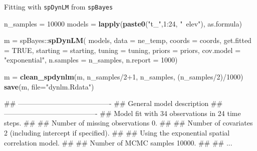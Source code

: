 \documentclass[11pt,ignorenonframetext,]{beamer}
\newenvironment{Shaded}{}{}
\newcommand{\DataTypeTok}[1]{\textcolor[rgb]{0.56,0.13,0.00}{#1}}
\newcommand{\DecValTok}[1]{\textcolor[rgb]{0.25,0.63,0.44}{#1}}
\newcommand{\KeywordTok}[1]{\textcolor[rgb]{0.00,0.44,0.13}{\textbf{#1}}}
\newcommand{\NormalTok}[1]{#1}
\newcommand{\OperatorTok}[1]{\textcolor[rgb]{0.40,0.40,0.40}{#1}}
\newcommand{\OtherTok}[1]{\textcolor[rgb]{0.00,0.44,0.13}{#1}}
\newcommand{\StringTok}[1]{\textcolor[rgb]{0.25,0.44,0.63}{#1}}
\let\oldShaded\Shaded
\let\endoldShaded\endShaded
\renewenvironment{Shaded}{\footnotesize\begin{spacing}{0.9}\oldShaded}{\endoldShaded\end{spacing}}
\let\oldverbatim\verbatim
\let\endoldverbatim\endverbatim
\newcommand{\scriptoutput}{
  \renewenvironment{Shaded}{\scriptsize\begin{spacing}{0.9}\oldShaded}{\endoldShaded\end{spacing}}
  \renewenvironment{verbatim}{\scriptsize\begin{spacing}{0.9}\oldverbatim}{\endoldverbatim\end{spacing}}
}
\begin{document}
\begin{frame}[fragile]{Fitting with \texttt{spDynLM} from
\texttt{spBayes}}
\protect\hypertarget{fitting-with-spdynlm-from-spbayes}{}

\scriptoutput

\begin{Shaded}
\begin{Highlighting}[]
\NormalTok{n_samples =}\StringTok{ }\DecValTok{10000}
\NormalTok{models =}\StringTok{ }\KeywordTok{lapply}\NormalTok{(}\KeywordTok{paste0}\NormalTok{(}\StringTok{"t_"}\NormalTok{,}\DecValTok{1}\OperatorTok{:}\DecValTok{24}\NormalTok{, }\StringTok{"~elev"}\NormalTok{), as.formula)}

\NormalTok{m =}\StringTok{ }\NormalTok{spBayes}\OperatorTok{::}\KeywordTok{spDynLM}\NormalTok{(}
\NormalTok{  models, }\DataTypeTok{data =}\NormalTok{ ne_temp, }\DataTypeTok{coords =}\NormalTok{ coords, }\DataTypeTok{get.fitted =} \OtherTok{TRUE}\NormalTok{,}
  \DataTypeTok{starting =}\NormalTok{ starting, }\DataTypeTok{tuning =}\NormalTok{ tuning, }\DataTypeTok{priors =}\NormalTok{ priors,}
  \DataTypeTok{cov.model =} \StringTok{"exponential"}\NormalTok{, }\DataTypeTok{n.samples =}\NormalTok{ n_samples, }\DataTypeTok{n.report =} \DecValTok{1000}\NormalTok{)}

\NormalTok{m =}\StringTok{ }\KeywordTok{clean_spdynlm}\NormalTok{(m, n_samples}\OperatorTok{/}\DecValTok{2}\OperatorTok{+}\DecValTok{1}\NormalTok{, n_samples, (n_samples}\OperatorTok{/}\DecValTok{2}\NormalTok{)}\OperatorTok{/}\DecValTok{1000}\NormalTok{)}
\KeywordTok{save}\NormalTok{(m, }\DataTypeTok{file=}\StringTok{"dynlm.Rdata"}\NormalTok{)}

\NormalTok{##  ----------------------------------------}
\NormalTok{##      General model description}
\NormalTok{##  ----------------------------------------}
\NormalTok{##  Model fit with 34 observations in 24 time steps.}
\NormalTok{##  }
\NormalTok{##  Number of missing observations 0.}
\NormalTok{##  }
\NormalTok{##  Number of covariates 2 (including intercept if specified).}
\NormalTok{##  }
\NormalTok{##  Using the exponential spatial correlation model.}
\NormalTok{##  }
\NormalTok{##  Number of MCMC samples 10000.}
\NormalTok{##}
\NormalTok{##  ...}
\end{Highlighting}
\end{Shaded}

\end{frame}
\end{document}
